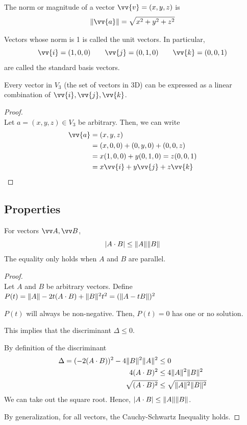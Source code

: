 \begin{definition}[Norm]
The norm or magnitude of a vector $\vv{v}=(x,y,z)$ is
$$
\norm{\vv{a}} = \sqrt{x^2+y^2+z^2}
$$
\end{definition}

\begin{definition}
Vectors whose norm is 1 is called the unit vectors. In particular,
$$
\vv{i}=(1,0,0) \qquad \vv{j}=(0,1,0) \qquad \vv{k}=(0,0,1)
$$
are called the standard basis vectors.
\end{definition}

\begin{theorem}
Every vector in $V_3$ (the set of vectors in 3D) can be expressed as a linear combination of $\vv{i},\vv{j},\vv{k}$.

\begin{proof}
\hfill \\
Let $a=(x,y,z) \in V_3$ be arbitrary. Then, we can write
\begin{align*}
    \vv{a} &= (x,y,z) \\
    &= (x,0,0)+(0,y,0)+(0,0,z) \\
    &= x(1,0,0)+y(0,1,0)=z(0,0,1) \\
    &= x\vv{i} + y\vv{j} + z\vv{k}
\end{align*}
\end{proof}
\end{theorem}

\subsection{Properties}

\begin{theorem}
For vectors $\vv A, \vv B$,
$$
|A\cdot B| \leq \lVert A \rVert\lVert B \rVert
$$
The equality only holds when $A$ and $B$ are parallel.

\begin{proof}
    \hfill \\
    Let $A$ and $B$ be arbitrary vectors.
    Define $P(t)=\lVert A \rVert-2t(A\cdot B)+\lVert B \rVert^2t^2 = (\lVert A-tB \rVert)^2$
    
    $P(t)$ will always be non-negative. Then, $P(t)=0$ has one or no solution.
    
    This implies that the discriminant $\Delta \leq 0$.
    
    By definition of the discriminant
    \begin{align*}
        \Delta = (-2(A \cdot B))^2 -4 \lVert B \rVert^2 \lVert A \rVert^2 &\leq 0 \\
        4(A\cdot B)^2 &\leq 4 \lVert A \rVert^2\lVert B \rVert^2 \\
        \sqrt{(A\cdot B)^2} & \leq \sqrt{\lVert A \rVert^2\lVert B \rVert^2}
    \end{align*}
    We can take out the square root. Hence, $|A\cdot B| \leq \lVert A \rVert\lVert B \rVert$.
    
    By generalization, for all vectors, the Cauchy-Schwartz Inequality holds.
\end{proof}
\end{theorem}

